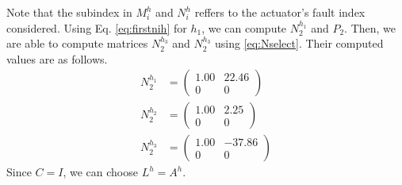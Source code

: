 \documentclass[letterpaper, 10 pt, conference]{ieeeconf}
\begin{document}
Note that the subindex in $M_i^h$ and $N_i^h$ reffers to the
actuator's fault index considered. Using Eq. \eqref{eq:firstnih} for
$h_1$, we can compute $N_2^{h_1}$ and $P_2$. Then, we are able to
compute matrices $N_2^{h_3}$ and $N_2^{h_3}$ using
\eqref{eq:Nselect}. Their computed values are as follows.
  \begin{align}
    N_2^{h_1} &=\left(
\begin{smallmatrix}
    1.00  & 22.46\\
    0       &  0
\end{smallmatrix} \right)\\
    N_2^{h_2}  &=\left(
\begin{smallmatrix}
    1.00&    2.25\\
    0     &    0\end{smallmatrix} \right)\\
    N_2^{h_3}  &=\left(
\begin{smallmatrix}
    1.00&  -37.86\\
    0   &      0\end{smallmatrix} \right)
  \end{align}
  Since $C=I$, we can choose $L^h = A^h$.
\end{document}
